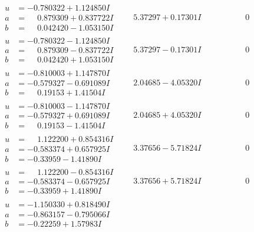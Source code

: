\documentclass[1p]{elsarticle_modified}
\theoremstyle{definition}
\begin{document}
$$\begin{array}{c|c|c}
\begin{aligned}
u &= -0.780322 + 1.124850 I \\
a &= \phantom{-}0.879309 + 0.837722 I \\
b &= \phantom{-}0.042420 - 1.053150 I\end{aligned}
 & \phantom{-}5.37297 + 0.17301 I & \phantom{-0.000000 } 0 \\ \hline\begin{aligned}
u &= -0.780322 - 1.124850 I \\
a &= \phantom{-}0.879309 - 0.837722 I \\
b &= \phantom{-}0.042420 + 1.053150 I\end{aligned}
 & \phantom{-}5.37297 - 0.17301 I & \phantom{-0.000000 } 0 \\ \hline\begin{aligned}
u &= -0.810003 + 1.147870 I \\
a &= -0.579327 - 0.691089 I \\
b &= \phantom{-}0.19153 + 1.41504 I\end{aligned}
 & \phantom{-}2.04685 - 4.05320 I & \phantom{-0.000000 } 0 \\ \hline\begin{aligned}
u &= -0.810003 - 1.147870 I \\
a &= -0.579327 + 0.691089 I \\
b &= \phantom{-}0.19153 - 1.41504 I\end{aligned}
 & \phantom{-}2.04685 + 4.05320 I & \phantom{-0.000000 } 0 \\ \hline\begin{aligned}
u &= \phantom{-}1.122200 + 0.854316 I \\
a &= -0.583374 + 0.657925 I \\
b &= -0.33959 - 1.41890 I\end{aligned}
 & \phantom{-}3.37656 - 5.71824 I & \phantom{-0.000000 } 0 \\ \hline\begin{aligned}
u &= \phantom{-}1.122200 - 0.854316 I \\
a &= -0.583374 - 0.657925 I \\
b &= -0.33959 + 1.41890 I\end{aligned}
 & \phantom{-}3.37656 + 5.71824 I & \phantom{-0.000000 } 0 \\ \hline\begin{aligned}
u &= -1.150330 + 0.818490 I \\
a &= -0.863157 - 0.795066 I \\
b &= -0.22259 + 1.57983 I\end{aligned}

\end{array}$$
\end{document}
